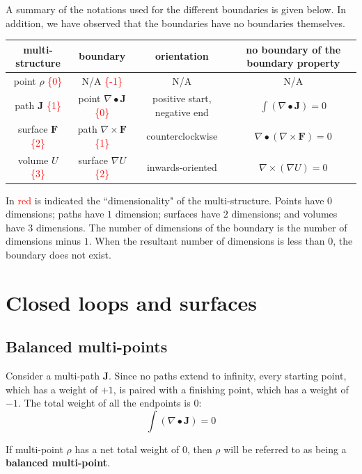 \documentclass{book}
\newcommand{\red}[1]{\textcolor{red}{#1}}
\begin{document}
A summary of the notations used for the different boundaries is given below. In addition, we have observed that the boundaries have no boundaries themselves.

\begin{center}
\begin{tabular}{|c||c|c|c|}
\hline
multi-structure & boundary & orientation & no boundary of the boundary property \\
\hline
\hline
point \(\rho\) \red{\{0\}} &
N/A \red{\{-1\}} &
N/A & 
N/A \\ 
\hline 
path \(\mathbf{J}\) \red{\{1\}} & 
point \(\nabla \bullet \mathbf{J}\) \red{\{0\}} & 
positive start, negative end &
\(\int (\nabla \bullet \mathbf{J}) = 0\) \\
\hline
surface \(\mathbf{F}\) \red{\{2\}} & 
path \(\nabla \times \mathbf{F}\) \red{\{1\}} & 
counterclockwise &
\(\nabla \bullet (\nabla \times \mathbf{F}) = 0\) \\
\hline
volume \(U\) \red{\{3\}} & 
surface \(\nabla U\) \red{\{2\}} & 
inwards-oriented & 
\(\nabla \times (\nabla U) = 0\) \\
\hline
\end{tabular}
\end{center}

In \red{red} is indicated the ``dimensionality" of the multi-structure. Points have \(0\) dimensions; paths have \(1\) dimension; surfaces have \(2\) dimensions; and volumes have \(3\) dimensions. The number of dimensions of the boundary is the number of dimensions minus \(1\). When the resultant number of dimensions is less than \(0\), the boundary does not exist.





\chapter{Closed loops and surfaces}

\section{Balanced multi-points}

Consider a multi-path \(\mathbf{J}\). Since no paths extend to infinity, every starting point, which has a weight of \(+1\), is paired with a finishing point, which has a weight of \(-1\). The total weight of all the endpoints is \(0\):
\[\int (\nabla \bullet \mathbf{J}) = 0\]

If multi-point \(\rho\) has a net total weight of \(0\), then \(\rho\) will be referred to as being a {\bf balanced multi-point}.
\end{document}

